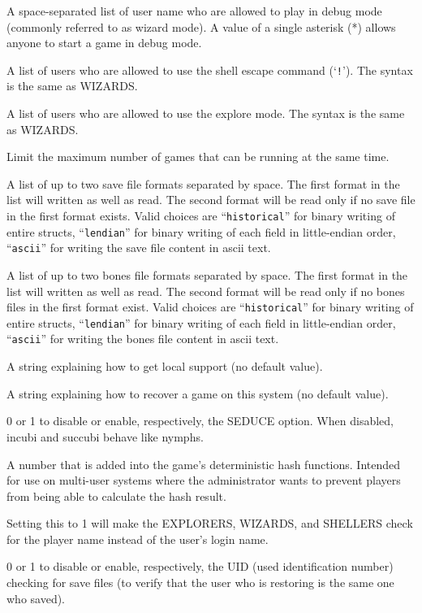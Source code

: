 \blist{}
\item[\ib{WIZARDS}]
A space-separated list of user name who are allowed to
play in debug mode (commonly referred to as wizard mode).
A value of a single
asterisk (*) allows anyone to start a game in debug mode.
\item[\ib{SHELLERS}]
A list of users who are allowed to use the shell escape command (`{\tt !}').
The syntax is the same as WIZARDS.
\item[\ib{EXPLORERS}]
A list of users who are allowed to use the explore mode.
The syntax is the same as WIZARDS.
\item[\ib{MAXPLAYERS}]
Limit the maximum number of games that can be running at the same time.
\item[\ib{SAVEFORMAT}]
A list of up to two save file formats separated by space.
The first format in the list will written as well as read. The second format
will be read only if no save file in the first format exists.
Valid choices are ``{\tt historical}'' for binary writing of entire structs,
``{\tt lendian}'' for binary writing of each field in little-endian order,
``{\tt ascii}'' for writing the save file content in ascii text.
\item[\ib{BONESFORMAT}]
A list of up to two bones file formats separated by space.
The first format in the list will written as well as read. The second
format will be read only if no bones files in the first format exist.
Valid choices are ``{\tt historical}'' for binary writing of entire structs,
``{\tt lendian}'' for binary writing of each field in little-endian order,
``{\tt ascii}'' for writing the bones file content in ascii text.
\item[\ib{SUPPORT}]
A string explaining how to get local support (no default value).
\item[\ib{RECOVER}]
A string explaining how to recover a game on this system (no default value).
\item[\ib{SEDUCE}]
0 or 1 to disable or enable, respectively, the SEDUCE option.
When disabled, incubi and succubi behave like nymphs.
\item[\ib{SERVERSEED}]
A number that is added into the game's deterministic hash functions. Intended
for use on multi-user systems where the administrator wants to prevent players
from being able to calculate the hash result.
\item[\ib{CHECK\verb+_+PLNAME}]
Setting this to 1 will make the EXPLORERS, WIZARDS, and SHELLERS check
for the player name instead of the user's login name.
\item[\ib{CHECK\verb+_+SAVE\verb+_+UID}]
0 or 1 to disable or enable, respectively, the UID
(used identification number) checking for save files (to verify that the
user who is restoring is the same one who saved).
\elist

